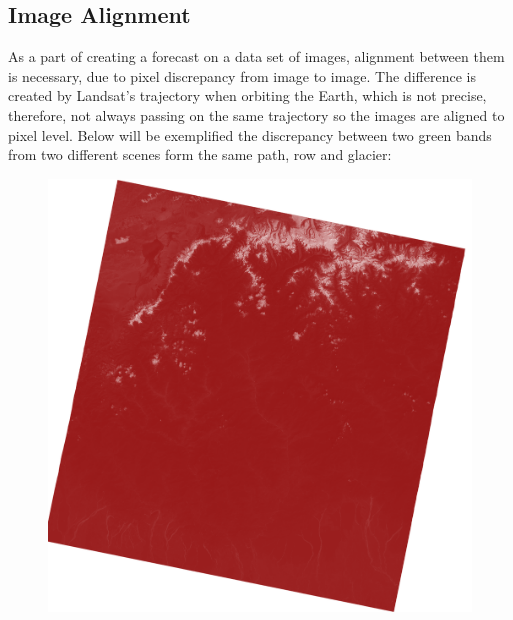 \documentclass[12pt, a4paper]{report}
\begin{document}
  	\subsection{Image Alignment}
  	As a part of creating a forecast on a data set of images, alignment between them is necessary, due to pixel discrepancy from image to image. The difference is created by Landsat's trajectory when orbiting the Earth, which is not precise, therefore, not always passing on the same trajectory so the images are aligned to pixel level. Below will be exemplified the discrepancy between two green bands from two different scenes form the same path, row and glacier:
  	
  	
  	\begin{figure}[H]
  		\includegraphics[width=\linewidth]{red_big_unaligned.png}
  		\endminipage\hfill

\end{figure}
\end{document}

